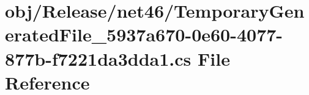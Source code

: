\hypertarget{_release_2net46_2_temporary_generated_file__5937a670-0e60-4077-877b-f7221da3dda1_8cs}{}\section{obj/\+Release/net46/\+Temporary\+Generated\+File\+\_\+5937a670-\/0e60-\/4077-\/877b-\/f7221da3dda1.cs File Reference}
\label{_release_2net46_2_temporary_generated_file__5937a670-0e60-4077-877b-f7221da3dda1_8cs}
